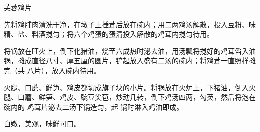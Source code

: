 %
%
%
%
%
%
%
\begin{recipe}{芙蓉鸡片}

\ingredients


\preparation

\step 先将鸡脯肉清洗干净，在墩子上捶茸后放在碗内；用二两鸡汤解散，投入豆粉、味
精、盐、料酒搅匀；将六个鸡蛋的蛋清投入解散的鸡茸内搅匀待用。

\step 将锅放在旺火上，倒下化猪油，烧至六成热时泌去油，用汤瓢将搅好的鸡茸舀入油
锅，摊成直径八寸、厚五厘的圆片，铲起放入盛有二汤的碗内；将鸡茸一直照样摊完（共
八片），放入碗内待用。

\step 火腿、口蘑、鲜笋、鸡皮都切成旗子块的小片。将锅放在火炉上，下猪油，倒入火
腿、口蘑、鲜笋、鸡皮、豌豆尖苞，炒动几转，倒下鸡汤四两，勾芡，然后将泡在碗内的
鸡茸片泌去二汤下锅造匀，起 锅时淋入鸡油即成。

\features

白嫩，美观，味鲜可口。

\end{recipe}

